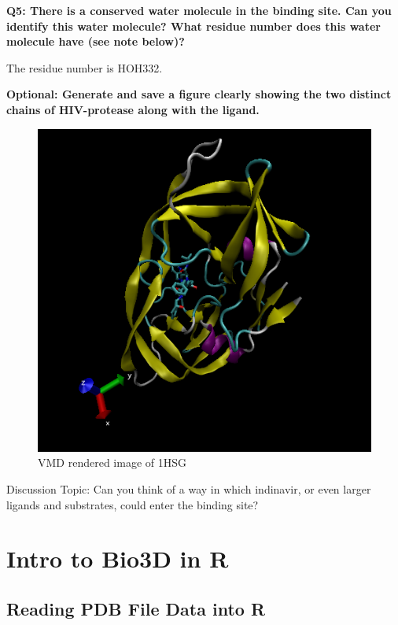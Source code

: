 \documentclass[
]{article}
\begin{document}
\textbf{Q5: There is a conserved water molecule in the binding site. Can
you identify this water molecule? What residue number does this water
molecule have (see note below)?}

The residue number is HOH332.

\textbf{Optional: Generate and save a figure clearly showing the two
distinct chains of HIV-protease along with the ligand.}

\begin{figure}
\centering
\includegraphics{vmdscene.png}
\caption{VMD rendered image of 1HSG}
\end{figure}

Discussion Topic: Can you think of a way in which indinavir, or even
larger ligands and substrates, could enter the binding site?

\hypertarget{intro-to-bio3d-in-r}{%
\section{Intro to Bio3D in R}\label{intro-to-bio3d-in-r}}

\hypertarget{reading-pdb-file-data-into-r}{%
\subsection{Reading PDB File Data into
R}\label{reading-pdb-file-data-into-r}}
\end{document}
